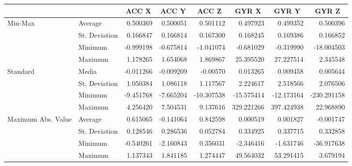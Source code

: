 \begin{landscape}
\pagestyle{empty}
\begin{table}[p!]

\centering
\begin{tabular}{ll|r|r|r|r|r|r|}
\cline{3-8}
 &  & \multicolumn{1}{c|}{\textbf{ACC X}} & \multicolumn{1}{c|}{\textbf{ACC Y}} & \multicolumn{1}{c|}{\textbf{ACC Z}} & \multicolumn{1}{c|}{\textbf{GYR X}} & \multicolumn{1}{c|}{\textbf{GYR Y}} & \multicolumn{1}{c|}{\textbf{GYR Z}} \\ \hline
\multicolumn{1}{|l|}{\multirow{4}{*}{Min-Max}} & Average & 0.500369	 & 0.500051 & 0.501112 & 0.497923 & 0.499352 & 0.500396 \\ \cline{2-8} 
\multicolumn{1}{|l|}{}                  & St. Deviation & 0.166847 & 0.166814 & 0.167300 & 0.168245 & 0.169386 & 0.166852 \\ \cline{2-8} 
\multicolumn{1}{|l|}{}                  & Minimum & -0.999198 & -0.675814	& -1.041074 & -0.681029 & -0.319990 & -18.004503 \\ \cline{2-8} 
\multicolumn{1}{|l|}{}                  & Maximum & 1.178265 & 1.654068 & 1.869867 & 25.395520 & 27.227514 & 2.345548 \\ \hline
\multicolumn{1}{|l|}{\multirow{4}{*}{Standard}} & Media & -0.011266 & -0.009209 & -0.00570 & 0.013265 & 0.009458 & 0.005644 \\ \cline{2-8} 
\multicolumn{1}{|l|}{}                  & St. Deviation & 1.050384 & 1.086118 & 1.117567 & 2.224617 & 2.518566 & 2.076506 \\ \cline{2-8} 
\multicolumn{1}{|l|}{}                  & Minimum & -9.451768 & -7.665204 & -10.307538 & -15.575414	 & -12.173164 & -230.291158 \\ \cline{2-8} 
\multicolumn{1}{|l|}{}                  & Maximum & 4.256420 & 7.504531 & 9.137616 & 329.221266 & 397.424938 & 22.968890 \\ \hline
\multicolumn{1}{|l|}{\multirow{4}{*}{Maximum Abs. Value}} & Average & 0.615065 & -0.141064 & 0.842598 & 0.000519 & 0.001827 & -0.001747 \\ \cline{2-8} 
\multicolumn{1}{|l|}{}                  & St. Deviation & 0.128546 & 0.286536 & 0.052784 & 0.334925 & 0.337715 & 0.332858 \\ \cline{2-8} 
\multicolumn{1}{|l|}{}                  & Minimum & -0.540261 & -2.160843	& 0.356031 & -2.346416 & -1.631746 & -36.917638 \\ \cline{2-8} 
\multicolumn{1}{|l|}{}                  & Maximum & 1.137343 & 1.841185 & 1.274447 & 49.564032 & 53.291415 & 3.679194 \\ \hline

\end{tabular}
\end{table}
\end{landscape}
